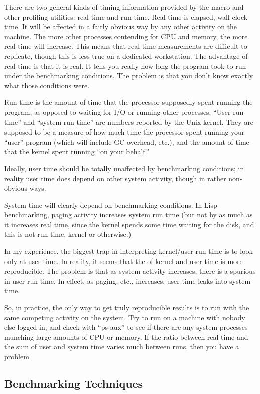 There are two general kinds of timing information provided by the
 macro and other profiling utilities: real time and run
time.  Real time is elapsed, wall clock time.  It will be affected in
a fairly obvious way by any other activity on the machine.  The more
other processes contending for CPU and memory, the more real time will
increase.  This means that real time measurements are difficult to
replicate, though this is less true on a dedicated workstation.  The
advantage of real time is that it is real.  It tells you really how
long the program took to run under the benchmarking conditions.  The
problem is that you don't know exactly what those conditions were.

Run time is the amount of time that the processor supposedly spent
running the program, as opposed to waiting for I/O or running other
processes.  ``User run time'' and ``system run time'' are numbers
reported by the Unix kernel.  They are supposed to be a measure of how
much time the processor spent running your ``user'' program (which
will include GC overhead, etc.), and the amount of time that the
kernel spent running ``on your behalf.''

Ideally, user time should be totally unaffected by benchmarking
conditions; in reality user time does depend on other system activity,
though in rather non-obvious ways.

System time will clearly depend on benchmarking conditions.  In Lisp
benchmarking, paging activity increases system run time (but not by as much
as it increases real time, since the kernel spends some time waiting for
the disk, and this is not run time, kernel or otherwise.)

In my experience, the biggest trap in interpreting kernel/user run time is
to look only at user time.  In reality, it seems that the  of kernel
and user time is more reproducible.  The problem is that as system activity
increases, there is a spurious  in user run time.  In effect, as
paging, etc., increases, user time leaks into system time.

So, in practice, the only way to get truly reproducible results is to run
with the same competing activity on the system.  Try to run on a machine
with nobody else logged in, and check with ``ps aux'' to see if there are any
system processes munching large amounts of CPU or memory.  If the ratio
between real time and the sum of user and system time varies much between
runs, then you have a problem.


\subsection{Benchmarking Techniques}

